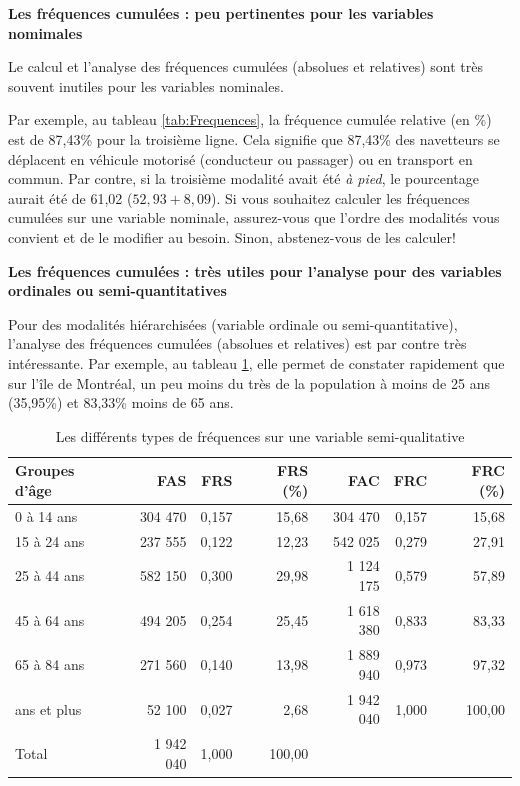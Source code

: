 \documentclass[
  11pt,
  french,
]{book}
\makeatletter
\newenvironment{kframev}{%
\medskip{}
\setlength{\fboxsep}{.8em}
 \def\at@end@of@kframev{}%
 \ifinner\ifhmode%
  \def\at@end@of@kframev{\end{minipage}}%
  \begin{minipage}{\columnwidth}%
 \fi\fi%
 \def\FrameCommand##1{\hskip\@totalleftmargin \hskip-\fboxsep
 \colorbox{shadebluecolor}{##1}\hskip-\fboxsep
     \hskip-\linewidth \hskip-\@totalleftmargin \hskip\columnwidth}%
 \MakeFramed {\advance\hsize-\width
   \@totalleftmargin\z@ \linewidth\hsize
   \@setminipage}}%
 {\par\unskip\endMakeFramed%
 \at@end@of@kframev}
\newenvironment{rmdblock}[1]
  {
  \begin{itemize}
  \renewcommand{\labelitemi}{
    \raisebox{-.7\height}[0pt][0pt]{
      {\setkeys{Gin}{width=3em,keepaspectratio}\texttt{[image: images/\#1]}}
    }
  }
  \setlength{\fboxsep}{1em}
  \begin{kframev}
  \small
  \item
  }
  {
  \end{kframev}
  \end{itemize}
  }
\newenvironment{bloc_attention}
  {\begin{rmdblock}{attention}}
  {\end{rmdblock}}
\makeatother
\begin{document}
\begin{bloc_attention}
\textbf{Les fréquences cumulées : peu pertinentes pour les variables nomimales}

Le calcul et l'analyse des fréquences cumulées (absolues et relatives) sont très souvent inutiles pour les variables nominales.

Par exemple, au tableau \ref{tab:Frequences}, la fréquence cumulée relative (en \%) est de 87,43\% pour la troisième ligne. Cela signifie que 87,43\% des navetteurs se déplacent en véhicule motorisé (conducteur ou passager) ou en transport en commun. Par contre, si la troisième modalité avait été \emph{à pied}, le pourcentage aurait été de 61,02 (\(52,93+8,09\)). Si vous souhaitez calculer les fréquences cumulées sur une variable nominale, assurez-vous que l'ordre des modalités vous convient et de le modifier au besoin. Sinon, abstenez-vous de les calculer!

\textbf{Les fréquences cumulées : très utiles pour l'analyse pour des variables ordinales ou semi-quantitatives}

Pour des modalités hiérarchisées (variable ordinale ou semi-quantitative), l'analyse des fréquences cumulées (absolues et relatives) est par contre très intéressante. Par exemple, au tableau \ref{tab:Frequences2}, elle permet de constater rapidement que sur l'île de Montréal, un peu moins du très de la population à moins de 25 ans (35,95\%) et 83,33\% moins de 65 ans.

\end{bloc_attention}

\begin{table}

\caption{\label{tab:Frequences2}Les différents types de fréquences sur une variable semi-qualitative}
\centering
\fontsize{8}{10}\selectfont
\begin{tabular}[t]{lrrrrrr}
\toprule
Groupes d'âge & FAS & FRS & FRS (\%) & FAC & FRC & FRC (\%)\\
\midrule
0 à 14 ans & 304 470 & 0,157 & 15,68 & 304 470 & 0,157 & 15,68\\
15 à 24 ans & 237 555 & 0,122 & 12,23 & 542 025 & 0,279 & 27,91\\
25 à 44 ans & 582 150 & 0,300 & 29,98 & 1 124 175 & 0,579 & 57,89\\
45 à 64 ans & 494 205 & 0,254 & 25,45 & 1 618 380 & 0,833 & 83,33\\
65 à 84 ans & 271 560 & 0,140 & 13,98 & 1 889 940 & 0,973 & 97,32\\
\addlinespace
85 ans et plus & 52 100 & 0,027 & 2,68 & 1 942 040 & 1,000 & 100,00\\
Total & 1 942 040 & 1,000 & 100,00 &  &  & \\
\bottomrule
\end{tabular}
\end{table}
\end{document}
